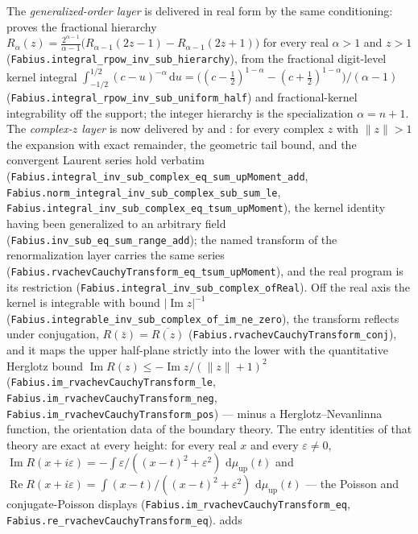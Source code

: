 \documentclass[11pt,oneside]{article}
\theoremstyle{definition}
\theoremstyle{remark}
\newcommand{\Up}{\operatorname{up}}
\newcommand{\dd}{\,\mathrm d}
\newcommand{\1}{\mathbf 1}
\DeclareMathOperator{\Rea}{Re}
\DeclareMathOperator{\Ima}{Im}
\begin{document}
\begin{statusbox}
The \emph{generalized-order layer} is delivered in real form by the same conditioning:
 proves the fractional hierarchy
\(R_\alpha(z)=\tfrac{2^{\alpha-1}}{\alpha-1}\bigl(R_{\alpha-1}(2z-1)-R_{\alpha-1}(2z+1)\bigr)\)
for every real \(\alpha>1\) and \(z>1\)
(\nolinkurl{Fabius.integral\_rpow\_inv\_sub\_hierarchy}), from the fractional digit-level
kernel integral
\(\int_{-1/2}^{1/2}(c-u)^{-\alpha}\dd u=\bigl((c-\tfrac12)^{1-\alpha}-(c+\tfrac12)^{1-\alpha}\bigr)/(\alpha-1)\)
(\nolinkurl{Fabius.integral\_rpow\_inv\_sub\_uniform\_half}) and fractional-kernel
integrability off the support; the integer hierarchy is the specialization
\(\alpha=n+1\).  The \emph{complex-\(z\) layer} is now delivered by
 and : for every complex
\(z\) with \(\lVert z\rVert>1\) the expansion with exact remainder, the geometric tail
bound, and the convergent Laurent series hold verbatim
(\nolinkurl{Fabius.integral\_inv\_sub\_complex\_eq\_sum\_upMoment\_add},
\nolinkurl{Fabius.norm\_integral\_inv\_sub\_complex\_sub\_sum\_le},
\nolinkurl{Fabius.integral\_inv\_sub\_complex\_eq\_tsum\_upMoment}), the kernel identity
having been generalized to an arbitrary field
(\nolinkurl{Fabius.inv\_sub\_eq\_sum\_range\_add}); the named transform of the
renormalization layer carries the same series
(\nolinkurl{Fabius.rvachevCauchyTransform\_eq\_tsum\_upMoment}), and the real program is
its restriction (\nolinkurl{Fabius.integral\_inv\_sub\_complex\_ofReal}).  Off the real
axis the kernel is integrable with bound \(\lvert\Ima z\rvert^{-1}\)
(\nolinkurl{Fabius.integrable\_inv\_sub\_complex\_of\_im\_ne\_zero}), the transform
reflects under conjugation, \(R(\bar z)=\overline{R(z)}\)
(\nolinkurl{Fabius.rvachevCauchyTransform\_conj}), and it maps the upper half-plane
strictly into the lower with the quantitative Herglotz bound
\(\Ima R(z)\le-\Ima z/(\lVert z\rVert+1)^2\)
(\nolinkurl{Fabius.im\_rvachevCauchyTransform\_le},
\nolinkurl{Fabius.im\_rvachevCauchyTransform\_neg},
\nolinkurl{Fabius.im\_rvachevCauchyTransform\_pos}) --- minus a Herglotz--Nevanlinna
function, the orientation data of the boundary theory.  The entry identities of that
theory are exact at every height: for every real \(x\) and every \(\varepsilon\ne0\),
\(\Ima R(x+i\varepsilon)=-\int\varepsilon/((x-t)^2+\varepsilon^2)\,\dd\mu_{\Up}(t)\)
and \(\Rea R(x+i\varepsilon)=\int(x-t)/((x-t)^2+\varepsilon^2)\,\dd\mu_{\Up}(t)\) ---
the Poisson and conjugate-Poisson displays
(\nolinkurl{Fabius.im\_rvachevCauchyTransform\_eq},
\nolinkurl{Fabius.re\_rvachevCauchyTransform\_eq}).   adds

\end{statusbox}
\end{document}
